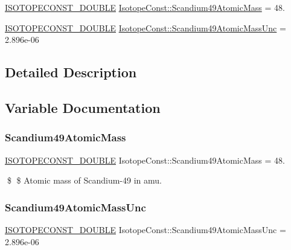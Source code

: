 \begin{DoxyCompactItemize}
\item 
\mbox{\hyperlink{group___isotope_const-_macros_ga8f45a7272ce02c0b4c65c44636ed719a}{I\+S\+O\+T\+O\+P\+E\+C\+O\+N\+S\+T\+\_\+\+D\+O\+U\+B\+LE}} \mbox{\hyperlink{group___isotope_const-_scandium-_sc49_gaa693bfbeff4156416f76a4f92090bbc9}{Isotope\+Const\+::\+Scandium49\+Atomic\+Mass}} = 48.
\item 
\mbox{\hyperlink{group___isotope_const-_macros_ga8f45a7272ce02c0b4c65c44636ed719a}{I\+S\+O\+T\+O\+P\+E\+C\+O\+N\+S\+T\+\_\+\+D\+O\+U\+B\+LE}} \mbox{\hyperlink{group___isotope_const-_scandium-_sc49_ga2aaed9e984fc6a07f3231b41a4f2ee67}{Isotope\+Const\+::\+Scandium49\+Atomic\+Mass\+Unc}} = 2.\+896e-\/06
\end{DoxyCompactItemize}


\subsection{Detailed Description}


\subsection{Variable Documentation}
\mbox{\label{group___isotope_const-_scandium-_sc49_gaa693bfbeff4156416f76a4f92090bbc9}} 
\subsubsection{\texorpdfstring{Scandium49\+Atomic\+Mass}{Scandium49AtomicMass}}
{\footnotesize\ttfamily \mbox{\hyperlink{group___isotope_const-_macros_ga8f45a7272ce02c0b4c65c44636ed719a}{I\+S\+O\+T\+O\+P\+E\+C\+O\+N\+S\+T\+\_\+\+D\+O\+U\+B\+LE}} Isotope\+Const\+::\+Scandium49\+Atomic\+Mass = 48.}

\$ \$ Atomic mass of Scandium-\/49 in amu. \mbox{\label{group___isotope_const-_scandium-_sc49_ga2aaed9e984fc6a07f3231b41a4f2ee67}} 
\subsubsection{\texorpdfstring{Scandium49\+Atomic\+Mass\+Unc}{Scandium49AtomicMassUnc}}
{\footnotesize\ttfamily \mbox{\hyperlink{group___isotope_const-_macros_ga8f45a7272ce02c0b4c65c44636ed719a}{I\+S\+O\+T\+O\+P\+E\+C\+O\+N\+S\+T\+\_\+\+D\+O\+U\+B\+LE}} Isotope\+Const\+::\+Scandium49\+Atomic\+Mass\+Unc = 2.\+896e-\/06}

